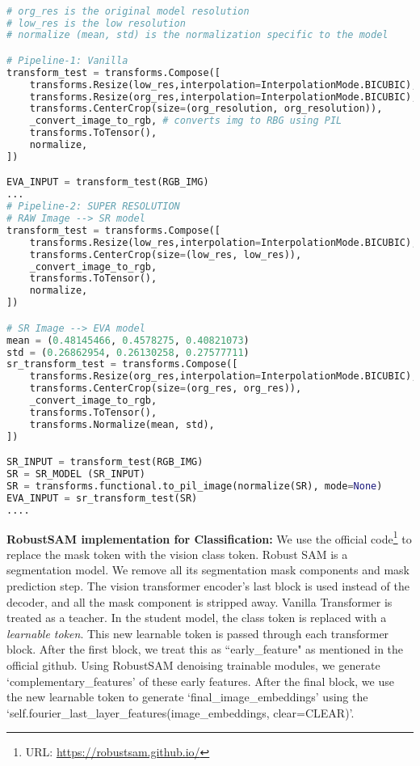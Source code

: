 \begin{lstlisting}[language=Python, caption=SR data preprocessing, label=code:transformation, basicstyle=\ttfamily\footnotesize, keywordstyle=\color{blue}, commentstyle=\color{green!60!black}, stringstyle=\color{red}]

# org_res is the original model resolution
# low_res is the low resolution 
# normalize (mean, std) is the normalization specific to the model

# Pipeline-1: Vanilla
transform_test = transforms.Compose([
    transforms.Resize(low_res,interpolation=InterpolationMode.BICUBIC),
    transforms.Resize(org_res,interpolation=InterpolationMode.BICUBIC),
    transforms.CenterCrop(size=(org_resolution, org_resolution)),
    _convert_image_to_rgb, # converts img to RBG using PIL
    transforms.ToTensor(),
    normalize,
])

EVA_INPUT = transform_test(RGB_IMG)
...
# Pipeline-2: SUPER RESOLUTION
# RAW Image --> SR model 
transform_test = transforms.Compose([
    transforms.Resize(low_res,interpolation=InterpolationMode.BICUBIC),
    transforms.CenterCrop(size=(low_res, low_res)),
    _convert_image_to_rgb,
    transforms.ToTensor(),
    normalize,
])

# SR Image --> EVA model 
mean = (0.48145466, 0.4578275, 0.40821073)
std = (0.26862954, 0.26130258, 0.27577711)
sr_transform_test = transforms.Compose([
    transforms.Resize(org_res,interpolation=InterpolationMode.BICUBIC),
    transforms.CenterCrop(size=(org_res, org_res)),
    _convert_image_to_rgb,
    transforms.ToTensor(),
    transforms.Normalize(mean, std),
])

SR_INPUT = transform_test(RGB_IMG)
SR = SR_MODEL (SR_INPUT)
SR = transforms.functional.to_pil_image(normalize(SR), mode=None)
EVA_INPUT = sr_transform_test(SR)
....

\end{lstlisting}


\noindent \textbf{RobustSAM implementation for Classification:}
We use the official code\footnote{URL: \url{https://robustsam.github.io/}} to replace the mask token with the vision class token. 
Robust SAM is a segmentation model. We remove all its segmentation mask components and mask prediction step. The vision transformer encoder's last block is used instead of the decoder, and all the mask component is stripped away. 
Vanilla Transformer is treated as a teacher. In the student model, the class token is replaced with a \textit{learnable token}. 
This new learnable token is passed through each transformer block. After the first block, we treat this as ``early\_feature" as mentioned in the official github. 
Using RobustSAM denoising trainable modules, we generate `complementary\_features' of these early features. 
After the final block, we use the new learnable token to generate 
`final\_image\_embeddings' using the `self.fourier\_last\_layer\_features\:(image\_embeddings, clear=CLEAR)'.

